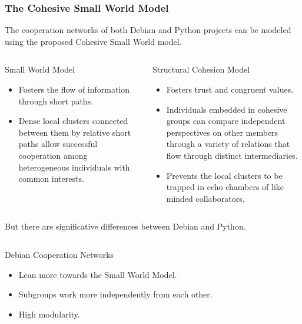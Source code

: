 \documentclass[ignorenonframetext,red,8pt,notes=show]{beamer}
\begin{document}
\begin{frame}
\frametitle{The Cohesive Small World Model}

The cooperation networks of both Debian and Python projects can be modeled using the proposed Cohesive Small World model.


\begin{columns}[c]
\begin{column}{0.5\textwidth}
\begin{block}{Small World Model}
\begin{itemize}
\item Fosters the flow of information through short paths.
\item Dense local clusters connected between them by relative short paths allow successful cooperation among heterogeneous individuals with common interests.
\end{itemize}
\end{block}
\end{column}

\begin{column}{0.5\textwidth}

\begin{block}{Structural Cohesion Model}
\begin{itemize}
\item Fosters trust and congruent values.
\item Individuals embedded in cohesive groups can compare independent perspectives on other members through a variety of relations that flow through distinct intermediaries.
\item Prevents the local clusters to be trapped in echo chambers of like minded       collaborators.
\end{itemize}
\end{block}
\end{column}
\end{columns}

\vspace{0.2cm}
But there are significative differences between Debian and Python.

\begin{columns}[c]
\begin{column}{0.5\textwidth}
\begin{block}{Debian Cooperation Networks}
\begin{itemize}
\item Lean more towards the Small World Model.
\item Subgroups work more independently from each other.
\item High modularity.
\end{itemize}
\end{block}
\end{column}


\end{columns}
\end{frame}
\end{document}
